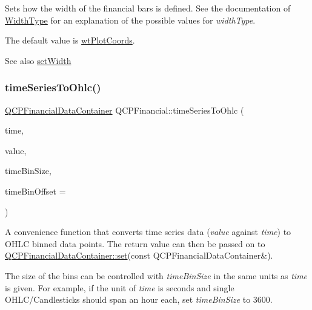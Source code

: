 Sets how the width of the financial bars is defined. See the documentation of \hyperlink{class_q_c_p_financial_aef1761dda71a53dc5269685e9e492626}{Width\+Type} for an explanation of the possible values for {\itshape width\+Type}.

The default value is \hyperlink{class_q_c_p_financial_aef1761dda71a53dc5269685e9e492626aebf2679f42649543a6cf372741d03ea3}{wt\+Plot\+Coords}.

\begin{DoxySeeAlso}{See also}
\hyperlink{class_q_c_p_financial_a99633f8bac86a61d534ae5eeb1a3068f}{set\+Width} 
\end{DoxySeeAlso}
\mbox{\label{class_q_c_p_financial_a9a058c035040d3939b8884f4aaccb1a7}} 
\subsubsection{\texorpdfstring{time\+Series\+To\+Ohlc()}{timeSeriesToOhlc()}}
{\footnotesize\ttfamily \hyperlink{class_q_c_p_data_container}{Q\+C\+P\+Financial\+Data\+Container} Q\+C\+P\+Financial\+::time\+Series\+To\+Ohlc (\begin{DoxyParamCaption}\item[{const \hyperlink{class_q_vector}{Q\+Vector}$<$ double $>$ \&}]{time,  }\item[{const \hyperlink{class_q_vector}{Q\+Vector}$<$ double $>$ \&}]{value,  }\item[{double}]{time\+Bin\+Size,  }\item[{double}]{time\+Bin\+Offset = {} }\end{DoxyParamCaption})\hspace{0.3cm}{\ttfamily [static]}}

A convenience function that converts time series data ({\itshape value} against {\itshape time}) to O\+H\+LC binned data points. The return value can then be passed on to \hyperlink{class_q_c_p_data_container_ae7042bd534fc3ce7befa2ce3f790b5bf}{Q\+C\+P\+Financial\+Data\+Container\+::set}(const Q\+C\+P\+Financial\+Data\+Container\&).

The size of the bins can be controlled with {\itshape time\+Bin\+Size} in the same units as {\itshape time} is given. For example, if the unit of {\itshape time} is seconds and single O\+H\+L\+C/\+Candlesticks should span an hour each, set {\itshape time\+Bin\+Size} to 3600.

